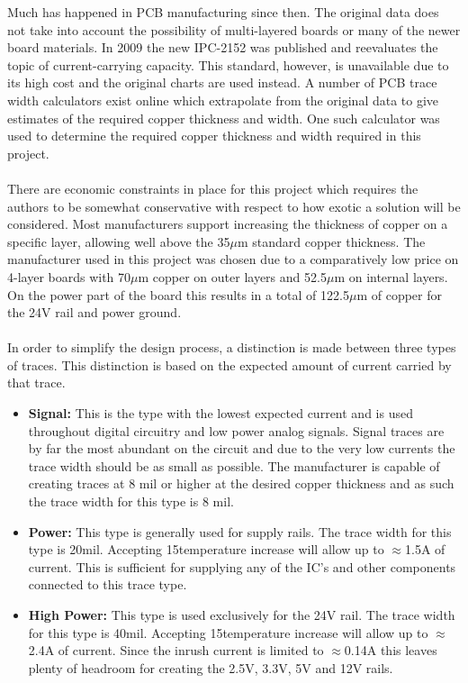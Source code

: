 Much has happened in PCB manufacturing since then. 
The original data does not take into account the possibility of multi-layered boards or many of the newer board materials.
In 2009 the new IPC-2152 \cite{ipc2152} was published and reevaluates the topic of current-carrying capacity.
This standard, however, is unavailable due to its high cost and the original charts are used instead.
A number of PCB trace width calculators exist online which extrapolate from the original data to give estimates of the required copper thickness and width.
One such calculator \cite{pcb_trace_calc} was used to determine the required copper thickness and width required in this project.
\\~\\
There are economic constraints in place for this project which requires the authors to be somewhat conservative with respect to how exotic a solution will be considered.
Most manufacturers support increasing the thickness of copper on a specific layer, allowing well above the 35$\mu$m standard copper thickness.
The manufacturer used in this project was chosen due to a comparatively low price on 4-layer boards with 70$\mu$m copper on outer layers and 52.5$\mu$m on internal layers.
On the power part of the board this results in a total of 122.5$\mu$m of copper for the 24V rail and power ground.
\\~\\
In order to simplify the design process, a distinction is made between three types of traces.
This distinction is based on the expected amount of current carried by that trace.
\begin{itemize}
	\item \textbf{Signal:} This is the type with the lowest expected current and is used throughout digital circuitry and low power analog signals.
	Signal traces are by far the most abundant on the circuit and due to the very low currents the trace width should be as small as possible.
	The manufacturer is capable of creating traces at 8 mil or higher at the desired copper thickness and as such the trace width for this type is 8 mil.
	\item \textbf{Power:} This type is generally used for supply rails.
	The trace width for this type is 20mil. Accepting 15\degree temperature increase will allow up to $\approx$1.5A of current.
	This is sufficient for supplying any of the IC's and other components connected to this trace type.
	\item \textbf{High Power:} This type is used exclusively for the 24V rail.
	The trace width for this type is 40mil. Accepting 15\degree temperature increase will allow up to $\approx$2.4A of current.
	Since the inrush current is limited to $\approx$0.14A this leaves plenty of headroom for creating the 2.5V, 3.3V, 5V and 12V rails.
\end{itemize}

